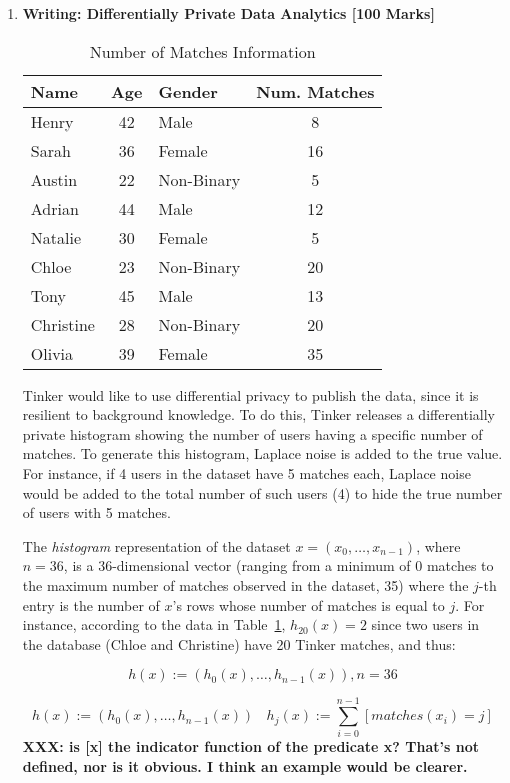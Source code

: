 \documentclass{article}
\newcommand{\0}{\mathbf{0}}
\newcommand{\1}{\mathbf{1}}
\begin{document}
\begin{enumerate}


\item \textbf{Writing: Differentially Private Data Analytics [100 Marks]}

	\begin{table}[h]
		\centering
		\begin{tabular}{|l|c|l|c|}
			\hline
			Name & Age & Gender & Num. Matches \\ 
			\hline
			Henry & 42 & Male & 8 \\
			Sarah & 36 & Female & 16 \\
			Austin & 22 & Non-Binary & 5 \\
			Adrian & 44 & Male & 12 \\
			Natalie & 30 & Female & 5 \\
			Chloe & 23 & Non-Binary & 20 \\
			Tony & 45 & Male & 13 \\
			Christine & 28 & Non-Binary & 20 \\
			Olivia & 39 & Female & 35 \\
			\hline
		\end{tabular}
		\caption{Number of Matches Information}
		\label{tab:originalTable}
	\end{table}
  
		Tinker would like to use differential 
		privacy to publish the data, since it is resilient to background knowledge. To do this, Tinker releases a differentially private histogram showing the number
		of users having a specific number of matches. To generate this histogram, Laplace 
		noise is added to the true value. For instance, if 4 users in the dataset have 5 matches each, Laplace noise would be added to the total number of such users (4) to hide the true number of users with 5 matches.
		
		The \emph{histogram} representation of the dataset $x = (x_0,\dots,x_{n-1})$, where $n=36$, is a 
		$36$-dimensional vector (ranging from a minimum of 0 matches to the maximum number of matches observed in the dataset, 35) where the $j$-th entry is the number of $x$'s rows whose number of matches is 
		equal to $j$. For instance, according to the data in Table~\ref{tab:originalTable}, $h_{20}(x) = 2$ since two users in the database (Chloe and Christine) have 20 Tinker matches, and thus:
		
		\[
		h(x) := \left(h_0(x),\dots,h_{{n-1}}(x)\right), n=36
		\]
		
		\[
   		h(x) := \left(h_0(x),\dots,h_{{n-1}}(x)\right) \ \ \ \ h_j(x) := 
   			 \sum_{i=0}^{{n-1}} [matches(x_i) = j] \]
                         \textbf{XXX: is [x] the indicator function of
                         the predicate x?  That's not defined, nor is it
                         obvious.  I think an example would be clearer.}
        \fi
		

\end{enumerate}
\end{document}
